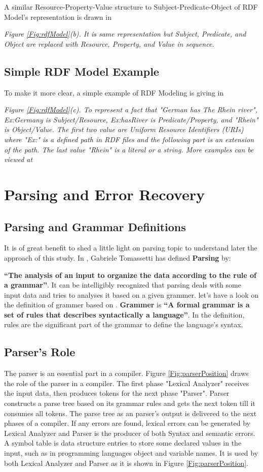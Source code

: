 {{{A similar Resource-Property-Value structure to Subject-Predicate-Object of RDF Model's representation is drawn in {\it Figure \ref{Fig:rdfModel}(b). It is same representation but Subject, Predicate, and Object are replaced with Resource, Property, and Value in sequence.  
\subsection{Simple RDF Model Example}

To make it more clear, a simple example of RDF Modeling is giving in {\it Figure \ref{Fig:rdfModel}(c). To represent a fact that "German has The Rhein river", Ex:Germany is Subject/Resource, Ex:hasRiver is Predicate/Property, and "Rhein" is Object/Value. The first two value are Uniform Resource Identifiers (URIs) where "Ex:" is a defined path in RDF files and the following part is an extension of the path. The last value "Rhein" is a literal or a string. More examples can be viewed at \cite{W3C:RDF-Primer:Online}

\section{Parsing and Error Recovery}
\subsection{Parsing and Grammar Definitions}
It is of great benefit to shed a little light on parsing topic to understand later the approach of this study. In \cite{parsingGuide2017}, Gabriele Tomassetti has defined \textbf{Parsing} by:

	\textbf{``The analysis of an input to organize the data according to the rule of a grammar''}. It can be intelligibly recognized that parsing deals with some input data and tries to analyses it based on a given grammer. let's have a look on the definition of grammer based on  \cite{parsingGuide2017}. \textbf{Grammer} is 
\textbf{``A formal grammar is a set of rules that describes syntactically a language''}. In the definition, rules are the significant part of the grammar to define the language's syntax.  
\subsection{Parser's Role}
The parser is an essential part in a compiler. Figure \ref*{Fig:parserPosition} draws the role of the parser in a compiler. The first phase "Lexical Analyzer" receives the input data, then produces tokens for the next phase "Parser". Parser constructs a parse tree based on its grammar rules and gets the next token till it consumes all tokens. The parse tree as an parser's output is delivered to the next phases of a compiler. If any errors are found, lexical errors can be generated by Lexical Analyzer and Parser is the producer of both Syntax and semantic errors.%
 A symbol table is data structure entries to store some declared values in the input, such as in programming languages object and variable names. It is used by both  Lexical Analyzer and Parser as it is shown in Figure \ref*{Fig:parserPosition}.

}}}}}
